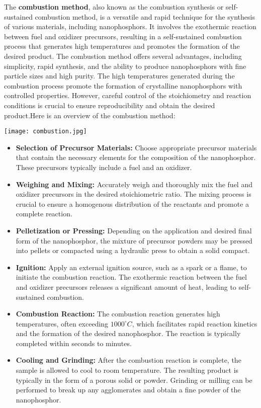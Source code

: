 \documentclass[../synthesis.tex]{subfiles}
\begin{document}
    The \textbf{combustion method}\cite{b10}, also known as the combustion synthesis or self-sustained combustion method, is 
    a versatile and rapid technique for the synthesis of various materials, including nanophosphors. It involves 
    the exothermic reaction between fuel and oxidizer precursors, resulting in a self-sustained combustion process 
    that generates high temperatures and promotes the formation of the desired product. 
    The combustion method offers several advantages, including simplicity, rapid synthesis, and the ability to 
    produce nanophosphors with fine particle sizes and high purity. The high temperatures generated during the 
    combustion process promote the formation of crystalline nanophosphors with controlled properties. However, 
    careful control of the stoichiometry and reaction conditions is crucial to ensure reproducibility and obtain 
    the desired product.Here is an overview of the combustion method:
    \begin{Figure}
        \centering
        \texttt{[image: combustion.jpg]}
        \label{fig:combustion}
    \end{Figure}
    \begin{itemize}
        \item \textbf{Selection of Precursor Materials: } Choose appropriate precursor materials that contain the 
        necessary elements for the composition of the nanophosphor. These precursors typically include a fuel and 
        an oxidizer.
        \item \textbf{Weighing and Mixing: }Accurately weigh and thoroughly mix the fuel and oxidizer precursors 
        in the desired stoichiometric ratio. The mixing process is crucial to ensure a homogenous distribution of 
        the reactants and promote a complete reaction.
        \item \textbf{Pelletization or Pressing: }Depending on the application and desired final form of the 
        nanophosphor, the mixture of precursor powders may be pressed into pellets or compacted using a hydraulic 
        press to obtain a solid compact.
        \item \textbf{Ignition: }Apply an external ignition source, such as a spark or a flame, to initiate the 
        combustion reaction. The exothermic reaction between the fuel and oxidizer precursors releases a 
        significant amount of heat, leading to self-sustained combustion.
        \item \textbf{Combustion Reaction: }The combustion reaction generates high temperatures, often exceeding 
        $1000^{\circ}C$, which facilitates rapid reaction kinetics and the formation of the desired nanophosphor. 
        The reaction is typically completed within seconds to minutes.
        \item \textbf{Cooling and Grinding: }After the combustion reaction is complete, the sample is allowed to 
        cool to room temperature. The resulting product is typically in the form of a porous solid or powder. 
        Grinding or milling can be performed to break up any agglomerates and obtain a fine powder of the 
        nanophosphor.
    \end{itemize}
\end{document}

